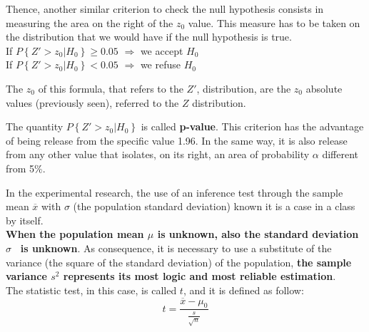 \begin{frame}
  Thence, another similar criterion to check the null hypothesis consists in measuring the area on the right of the $ z_0 $ value. This measure has to be taken on the distribution that we would have if the null hypothesis is true.\\
  \vspace*{.2cm}
  If $ P \left\{ Z' > z_0 \lvert H_0 \right\} \geq 0.05 $ $\Rightarrow $ we accept $ H_0 $\\
  \vspace*{.1cm}
  If $ P  \left\{ Z' > z_0 \lvert H_0 \right\} < 0.05 $ $\Rightarrow $ we refuse $ H_0 $\\
  \vspace*{.2cm}
  \begin{footnotesize}
    The $ z_0 $ of this formula, that refers to the $ Z' $, distribution, are the $ z_0 $ absolute values (previously seen), referred to the $ Z $ distribution.\\
  \end{footnotesize}
  \vspace*{.5cm}
  The quantity $ P \left\{ Z'>z_0 \lvert H_0 \right\} $ is called \textbf{p-value}.
  This criterion has the advantage of being release from the specific value 1.96. In the same way, it is also release from any other value that isolates, on its right, an area of probability $\alpha$ different from 5$ \% $.
\end{frame}




\begin{frame}
  \vspace*{.25cm}
  In the experimental  research, the use of an inference test through the sample mean {\boldmath $ \overline{x} $} with {\boldmath $ \sigma $} (the population standard deviation) known  it is a case in a class by itself.\\
  \vspace*{.25cm}
  \textbf{When the population mean {\boldmath $ \mu $} is unknown, also the standard deviation \textbf{\boldmath $ \sigma $}} \textbf{\ is unknown}. As consequence, it is necessary to use a substitute of the variance (the square of the standard deviation) of the population, \textbf{the sample variance {\boldmath $ s^2 $} represents its most logic and most reliable estimation}.\\
  \vspace*{.25cm}
  The statistic test, in this case, is called $ t $, and it is defined as follow:\\
  $$ t = \frac{\overline{x} - \mu_0}{\frac{s}{\sqrt{n}}} $$
\end{frame}

